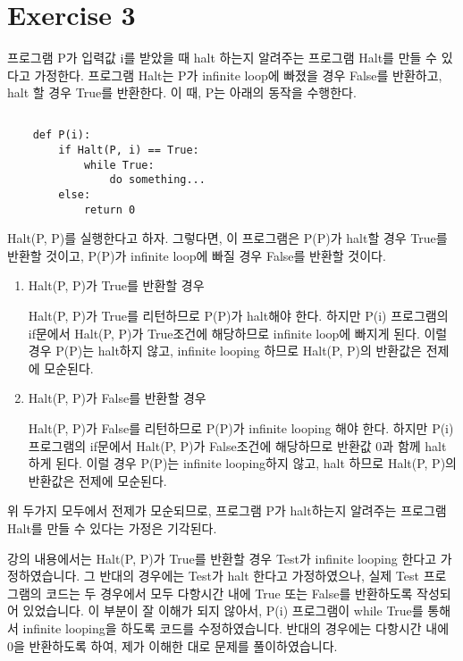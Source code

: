 \documentclass{article}
\begin{document}
\section{Exercise 3}
프로그램 P가 입력값 i를 받았을 때 halt 하는지 알려주는 프로그램 Halt를 만들 수 있다고 가정한다.
프로그램 Halt는 P가 infinite loop에 빠졌을 경우 False를 반환하고, halt 할 경우 True를 반환한다.
이 때, P는 아래의 동작을 수행한다.

\subsection{}
\begin{lstlisting}
    def P(i):
        if Halt(P, i) == True:
            while True:
                do something...
        else:
            return 0
\end{lstlisting}

Halt(P, P)를 실행한다고 하자.
그렇다면, 이 프로그램은 P(P)가 halt할 경우 True를 반환할 것이고, P(P)가 infinite loop에 빠질 경우 False를 반환할 것이다.

\begin{enumerate}
    \item Halt(P, P)가 True를 반환할 경우

    Halt(P, P)가 True를 리턴하므로 P(P)가 halt해야 한다. 하지만 P(i) 프로그램의 if문에서 Halt(P, P)가 True조건에 해당하므로 infinite loop에 빠지게 된다.
    이럴 경우 P(P)는 halt하지 않고, infinite looping 하므로 Halt(P, P)의 반환값은 전제에 모순된다.

    \item Halt(P, P)가 False를 반환할 경우

    Halt(P, P)가 False를 리턴하므로 P(P)가 infinite looping 해야 한다. 하지만 P(i) 프로그램의 if문에서 Halt(P, P)가 False조건에 해당하므로 반환값 0과 함께 halt 하게 된다.
    이럴 경우 P(P)는 infinite looping하지 않고, halt 하므로 Halt(P, P)의 반환값은 전제에 모순된다.
\end{enumerate}

위 두가지 모두에서 전제가 모순되므로, 프로그램 P가 halt하는지 알려주는 프로그램 Halt를 만들 수 있다는 가정은 기각된다.


강의 내용에서는 Halt(P, P)가 True를 반환할 경우 Test가 infinite looping 한다고 가정하였습니다. 그 반대의 경우에는 Test가 halt 한다고 가정하였으나,
실제 Test 프로그램의 코드는 두 경우에서 모두 다항시간 내에 True 또는 False를 반환하도록 작성되어 있었습니다. 이 부분이 잘 이해가 되지 않아서, P(i) 프로그램이
while True를 통해서 infinite looping을 하도록 코드를 수정하였습니다. 반대의 경우에는 다항시간 내에 0을 반환하도록 하여, 제가 이해한 대로 문제를 풀이하였습니다.
\end{document}
